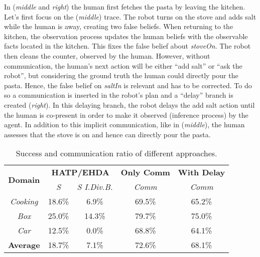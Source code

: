 {In (\textit{middle} and \textit{right}) the human first fetches the pasta by leaving the kitchen. Let's first focus on the (\textit{middle}) trace. The robot turns on the stove and adds salt while the human is away, creating two false beliefs. When returning to the kitchen, the observation process updates the human beliefs with the observable facts located in the kitchen. This fixes the false belief about \textit{stoveOn}. The robot then cleans the counter, observed by the human. 
However, without communication, the human's next action will be either ``add salt'' or ``ask the robot'', but considering the ground truth the human could directly pour the pasta. Hence, the false belief on \textit{saltIn} is relevant and has to be corrected. To do so a communication is inserted in the robot's plan and a ``delay'' branch is created (\textit{right}). 
In this delaying branch, the robot delays the add salt action until the human is co-present in order to make it observed (inference process) by the agent. 
In addition to this implicit communication, like in (\textit{middle}), the human assesses that the stove is on and hence can directly pour the pasta. 
\begin{table}[t]
    \centering
    \vspace{0.1cm}
    \caption
    {
    Success and communication ratio of different approaches. 
    }
    \label{tab:q_results}
    \begin{tabular}{@{}c|c c|| c| c@{}}
        \multirow{2}{*}{\textbf{Domain}} & \multicolumn{2}{c||}{\textbf{HATP/EHDA}} & \multicolumn{1}{c|}{\textbf{Only Comm}} & \multicolumn{1}{c}{\textbf{With Delay}}
        \\
        & \multicolumn{1}{c}{\textit{S}} & \multicolumn{1}{c||}{\textit{S I.Div.B.}} & \multicolumn{1}{c|}{\textit{Comm}} & \multicolumn{1}{c}{\textit{Comm}} 
        \\ \cline{1-5}
        \textit{Cooking}    &   18.6\%  &  6.9\%    & 69.5\% & 65.2\%\\
        \textit{Box}        &   25.0\%  & 14.3\%    & 79.7\% & 75.0\%\\
        \textit{Car}        &   12.5\%  & 0.0\%     & 68.8\% & 64.1\%\\
        \hline
        \textbf{Average}    &   18.7\%  & 7.1\%     & 72.6\% & 68.1\%\\
    \end{tabular}
\end{table}

}
